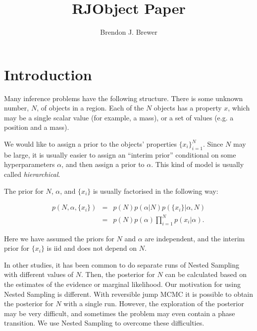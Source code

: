\documentclass[letterpaper, 11pt]{article}
\title{RJObject Paper}
\author{Brendon J. Brewer}
\begin{document}
\maketitle
{}

\section{Introduction}
\setlength{\parindent}{0cm}
\setlength{\parskip}{3mm}
Many inference problems have the following structure. There is some unknown
number, $N$, of objects in a region. Each of the $N$ objects has a property
$x$, which may be a single scalar value (for example, a mass), or a set of
values (e.g. a position and a mass).

We would like to assign a prior to the objects' properties $\{x_i\}_{i=1}^N$.
Since $N$ may be large, it is usually easier to assign an ``interim prior''
conditional on some hyperparameters $\alpha$, and then assign a prior to
$\alpha$. This kind of model is usually called {\it hierarchical}.

The prior for $N$, $\alpha$, and $\{x_i\}$ is usually factorised
in the following way:

\begin{eqnarray}
p(N, \alpha, \{x_i\}) &=& p(N) p(\alpha | N) p(\{x_i\} | \alpha, N) \\
&=& p(N) p(\alpha) \prod_{i=1}^N p(x_i | \alpha).
\end{eqnarray}

Here we have assumed the priors for $N$ and $\alpha$ are independent, and
the interim prior for $\{x_i\}$ is iid and does not depend on $N$.


In other studies, it has been common to do separate runs of Nested Sampling
with different values of $N$. Then, the posterior for $N$ can be calculated
based on the estimates of the evidence or marginal likelihood. Our motivation
for using Nested Sampling is different. With reversible jump MCMC it is possible
to obtain the posterior for $N$ with a single run. However, the exploration
of the posterior may be very difficult, and sometimes the problem may even
contain a phase transition. We use Nested Sampling to overcome these
difficulties.

\end{document}
